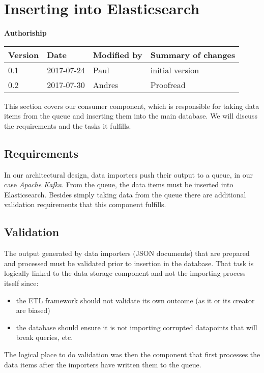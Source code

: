 \section{Inserting into
Elasticsearch}\label{inserting-into-elasticsearch}

\textbf{Authoriship}

\begin{longtable}[]{@{}llll@{}}
\toprule
Version & Date & Modified by & Summary of changes\tabularnewline
\midrule
\endhead
0.1 & 2017-07-24 & Paul & initial version\tabularnewline
0.2 & 2017-07-30 & Andres & Proofread\tabularnewline
\bottomrule
\end{longtable}

This section covers our consumer component, which is responsible for
taking data items from the queue and inserting them into the main
database. We will discuss the requirements and the tasks it fulfills.

\subsection{Requirements}\label{requirements}

In our architectural design, data importers push their output to a
queue, in our case \emph{Apache Kafka}. From the queue, the data items
must be inserted into Elasticsearch. Besides simply taking data from the
queue there are additional validation requirements that this component
fulfills.

\subsection{Validation}\label{validation}

The output generated by data importers (JSON documents) that are
prepared and processed must be validated prior to insertion in the
database. That task is logically linked to the data storage component
and not the importing process itself since:

\begin{itemize}
\tightlist
\item
  the ETL framework should not validate its own outcome (as it or its
  creator are biased)
\item
  the database should ensure it is not importing corrupted datapoints
  that will break queries, etc.
\end{itemize}

The logical place to do validation was then the component that first
processes the data items after the importers have written them to the
queue.


